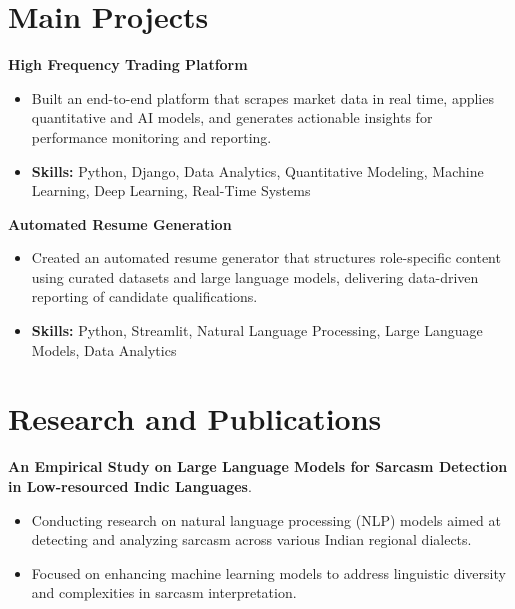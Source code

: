 \documentclass[a4paper,11pt]{article}
\begin{document}
\section{\textbf{Main Projects}}

\vspace{1mm}
  \textbf{High Frequency Trading Platform  }
\vspace{-1.5mm} %
\begin{itemize}
  \item Built an end-to-end platform that scrapes market data in real time, applies quantitative and AI models, and generates actionable insights for performance monitoring and reporting.
\vspace{-3mm}
  \item \textbf{Skills:} Python, Django, Data Analytics, Quantitative Modeling, Machine Learning, Deep Learning, Real-Time Systems
\end{itemize}


\vspace{1mm}
   \textbf{Automated Resume Generation }
\vspace{-1.5mm} %
\begin{itemize}
  \item Created an automated resume generator that structures role-specific content using curated datasets and large language models, delivering data-driven reporting of candidate qualifications.
\vspace{-3mm}
  \item \textbf{Skills:} Python, Streamlit, Natural Language Processing, Large Language Models, Data Analytics
\end{itemize}



\section{\textbf{Research and Publications} \hfill }
\vspace{1mm}
  \textbf{An Empirical Study on Large Language Models for Sarcasm Detection in Low-resourced Indic Languages}.
\vspace{-1mm} %
\begin{itemize}
  \item Conducting research on natural language processing (NLP) models aimed at detecting and analyzing sarcasm across various Indian regional dialects.
\vspace{-3mm}
  \item Focused on enhancing machine learning models to address linguistic diversity and complexities in sarcasm interpretation.
\end{itemize}
\end{document}
